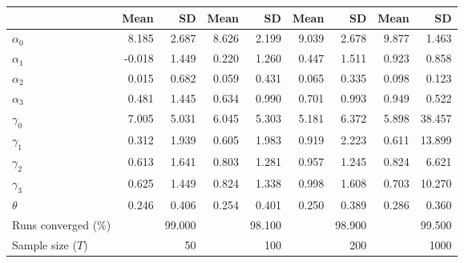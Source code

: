 
\begin{tabular}[t]{lrrrrrrrr}
\toprule
  & Mean & SD & Mean  & SD  & Mean   & SD   & Mean    & SD   \\
\midrule
$\alpha_{0}$ & 8.185 & 2.687 & 8.626 & 2.199 & 9.039 & 2.678 & 9.877 & 1.463\\
$\alpha_{1}$ & -0.018 & 1.449 & 0.220 & 1.260 & 0.447 & 1.511 & 0.923 & 0.858\\
$\alpha_{2}$ & 0.015 & 0.682 & 0.059 & 0.431 & 0.065 & 0.335 & 0.098 & 0.123\\
$\alpha_{3}$ & 0.481 & 1.445 & 0.634 & 0.990 & 0.701 & 0.993 & 0.949 & 0.522\\
$\gamma_{0}$ & 7.005 & 5.031 & 6.045 & 5.303 & 5.181 & 6.372 & 5.898 & 38.457\\
$\gamma_{1}$ & 0.312 & 1.939 & 0.605 & 1.983 & 0.919 & 2.223 & 0.611 & 13.899\\
$\gamma_{2}$ & 0.613 & 1.641 & 0.803 & 1.281 & 0.957 & 1.245 & 0.824 & 6.621\\
$\gamma_{3}$ & 0.625 & 1.449 & 0.824 & 1.338 & 0.998 & 1.608 & 0.703 & 10.270\\
$\theta$ & 0.246 & 0.406 & 0.254 & 0.401 & 0.250 & 0.389 & 0.286 & 0.360\\
Runs converged (\%) &  & 99.000 &  & 98.100 &  & 98.900 &  & 99.500\\
Sample size ($T$) &  & 50 &  & 100 &  & 200 &  & 1000\\
\bottomrule
\end{tabular}
